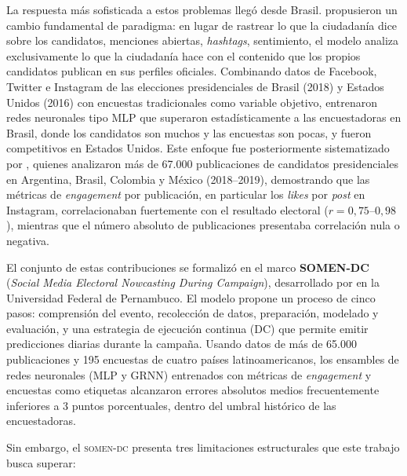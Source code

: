 La respuesta más sofisticada a estos problemas llegó desde Brasil.
\textcite{brito2020predicting} propusieron un cambio fundamental de paradigma:
en lugar de rastrear lo que la ciudadanía dice sobre los candidatos,
menciones abiertas, \textit{hashtags}, sentimiento, el modelo analiza
exclusivamente lo que la ciudadanía hace con el contenido que los propios
candidatos publican en sus perfiles oficiales. Combinando datos de Facebook,
Twitter e Instagram de las elecciones presidenciales de Brasil (2018) y
Estados Unidos (2016) con encuestas tradicionales como variable objetivo,
entrenaron redes neuronales tipo MLP que superaron estadísticamente a las
encuestadoras en Brasil, donde los candidatos son muchos y las encuestas
son pocas, y fueron competitivos en Estados Unidos. Este enfoque fue
posteriormente sistematizado por \textcite{brito2022measuring}, quienes
analizaron más de 67.000 publicaciones de candidatos presidenciales en
Argentina, Brasil, Colombia y México (2018--2019), demostrando que las
métricas de \textit{engagement} por publicación, en particular los
\textit{likes} por \textit{post} en Instagram, correlacionaban fuertemente
con el resultado electoral ($r = 0{,}75$--$0{,}98$), mientras que el
número absoluto de publicaciones presentaba correlación nula o negativa.

El conjunto de estas contribuciones se formalizó en el marco
\textbf{SOMEN-DC} (\textit{Social Media Electoral Nowcasting During Campaign}),
desarrollado por \textcite{brito2023somen} en la Universidad Federal de
Pernambuco. El modelo propone un proceso de cinco pasos: comprensión del evento, recolección de datos, preparación, modelado y evaluación, y una
estrategia de ejecución continua (DC) que permite emitir predicciones diarias
durante la campaña. Usando datos de más de 65.000 publicaciones y 195
encuestas de cuatro países latinoamericanos, los ensambles de redes neuronales
(MLP y GRNN) entrenados con métricas de \textit{engagement} y encuestas como
etiquetas alcanzaron errores absolutos medios frecuentemente inferiores a
3 puntos porcentuales, dentro del umbral histórico de las encuestadoras.

Sin embargo, el \textsc{somen-dc} presenta tres limitaciones estructurales que
este trabajo busca superar:

